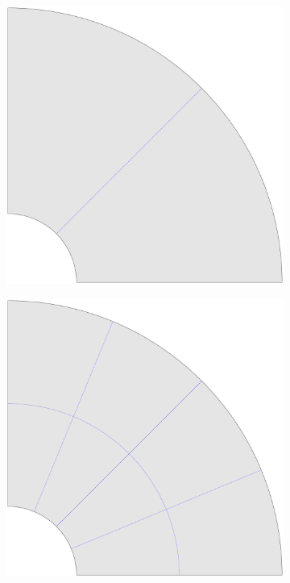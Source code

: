 \documentclass{article}
\begin{document}
\begin{figure}
    \centering
    \begin{subfigure}[b]{0.18\linewidth}        %
        \centering
        \includegraphics[width=\linewidth]{mesh_hole_0}
    \end{subfigure}
    \begin{subfigure}[b]{0.18\linewidth}        %
        \centering
        \includegraphics[width=\linewidth]{mesh_hole_1}

\end{subfigure}
\end{figure}
\end{document}
